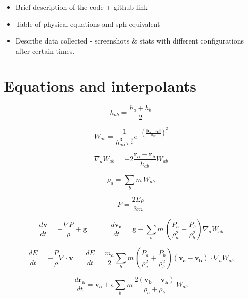 \documentclass[../main.tex]{subfiles}
\begin{document}
\begin{itemize}
    \item Brief description of the code + github link
    \item Table of physical equations and sph equivalent
    \item Describe data collected - screenshots \& stats with different configurations after certain
        times.
\end{itemize}

\section{Equations and interpolants}

\begin{equation}
    h_{ab} = \frac{h_a + h_b}{2}
\end{equation}

\begin{equation}
    W_{ab} = \frac{1}{h_{ab}^3 \, \pi^{\frac{3}{2}}} e^{-(\frac{||\bm{r_a} - \bm{r_b}||}{h_{ab}})^2}
\end{equation}

\begin{equation}
    \nabla_a W_{ab} = -2 \frac{\bm{r_a} - \bm{r_b}}{h_{ab}} W_{ab}
\end{equation}

\begin{equation}
    \rho_a = \sum_b m \, W_{ab}
\end{equation}

\begin{equation}
    P = \frac{2 E \rho}{3 m}
\end{equation}

\begin{equation}
    \frac{d\bm{v}}{dt}
    = -\frac{\nabla P}{\rho} + \bm{g}
    \hspace{20pt}
    \hspace{20pt}
    \frac{d\bm{v_a}}{dt}
    = \bm{g} - \sum_b m \, (\frac{P_a}{\rho_a^2} + \frac{P_b}{\rho_b^2}) \nabla_a W_{ab}
\end{equation}

\begin{equation}
    \frac{dE}{dt}
    = - \frac{P}{\rho} \nabla \cdot \bm{v}
    \hspace{20pt}
    \frac{dE}{dt}
    = \frac{m_a}{2} \sum_b m \, (\frac{P_a}{\rho_a^2} + \frac{P_b}{\rho_b^2}) (\bm{v_a} - \bm{v_b})
    \cdot \nabla_a W_{ab}
\end{equation}

\begin{equation}
    \frac{d\bm{r_a}}{dt}
    = \bm{v_a} + \epsilon \sum_b m \, \frac{2 (\bm{v_b} - \bm{v_a})}{\rho_a + \rho_b} \, W_{ab}
\end{equation}
\end{document}
